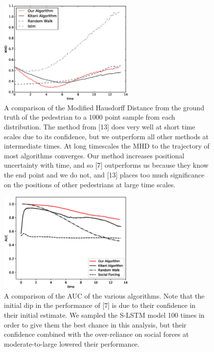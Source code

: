 \documentclass[usenames,dvipsnames]{article}
\begin{document}
\begin{enumerate}
\begin{item}
\end{item}
\begin{figure}
	\centering
	\includegraphics[width=0.6\textwidth]{paper/figures/mhd_results.eps}
	\caption{A comparison of the Modified Hausdorff Distance from the ground truth of the pedestrian to a 1000 point sample from each distribution. The method from [13] does very well at short time scales due to its confidence, but we outperform all other methods at intermediate times. At long timescales the MHD to the trajectory of most algorithms converges. Our method increases positional uncertainty with time, and so [7] outperforms us because they know the end point and we do not, and [13] places too much significance on the positions of other pedestrians at large time scales.}
	\label{MHD}
\end{figure}

\begin{figure}
	\centering
	\includegraphics[width=0.6\textwidth]{paper/figures/the_results.eps}
	\caption{A comparison of the AUC of the various algorithms. Note that the initial dip in the performance of [7] is due to their confidence in their initial estimate. We sampled the S-LSTM model 100 times in order to give them the best chance in this analysis, but their confidence combined with the over-reliance on social forces at moderate-to-large lowered their performance.}
	\label{AUC}
\end{figure}


\end{enumerate}
\end{document}
